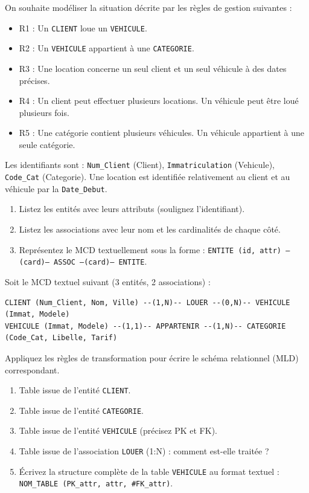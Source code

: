 \documentclass[11pt]{article}
\begin{document}
\begin{exercice}
On souhaite modéliser la situation décrite par les règles de gestion suivantes :
\begin{itemize}
    \item R1 : Un \texttt{CLIENT} loue un \texttt{VEHICULE}.
    \item R2 : Un \texttt{VEHICULE} appartient à une \texttt{CATEGORIE}.
    \item R3 : Une location concerne un seul client et un seul véhicule à des dates précises.
    \item R4 : Un client peut effectuer plusieurs locations. Un véhicule peut être loué plusieurs fois.
    \item R5 : Une catégorie contient plusieurs véhicules. Un véhicule appartient à une seule catégorie.
\end{itemize}
Les identifiants sont : \texttt{Num\_Client} (Client), \texttt{Immatriculation} (Vehicule), \texttt{Code\_Cat} (Categorie). Une location est identifiée relativement au client et au véhicule par la \texttt{Date\_Debut}.
\begin{enumerate}
    \item Listez les entités avec leurs attributs (soulignez l'identifiant).
    \item Listez les associations avec leur nom et les cardinalités de chaque côté.
    \item Représentez le MCD textuellement sous la forme :
    \texttt{ENTITE (id, attr) --(card)-- ASSOC --(card)-- ENTITE}.
\end{enumerate}
\end{exercice}

\begin{exercice}
Soit le MCD textuel suivant (3 entités, 2 associations) :
\begin{verbatim}
CLIENT (Num_Client, Nom, Ville) --(1,N)-- LOUER --(0,N)-- VEHICULE (Immat, Modele)
VEHICULE (Immat, Modele) --(1,1)-- APPARTENIR --(1,N)-- CATEGORIE (Code_Cat, Libelle, Tarif)
\end{verbatim}
Appliquez les règles de transformation pour écrire le schéma relationnel (MLD) correspondant.
\begin{enumerate}
    \item Table issue de l'entité \texttt{CLIENT}.
    \item Table issue de l'entité \texttt{CATEGORIE}.
    \item Table issue de l'entité \texttt{VEHICULE} (précisez PK et FK).
    \item Table issue de l'association \texttt{LOUER} (1:N) : comment est-elle traitée ?
    \item Écrivez la structure complète de la table \texttt{VEHICULE} au format textuel :
    \texttt{NOM\_TABLE (PK\_attr, attr, \#FK\_attr)}.
\end{enumerate}
\end{exercice}
\end{document}
